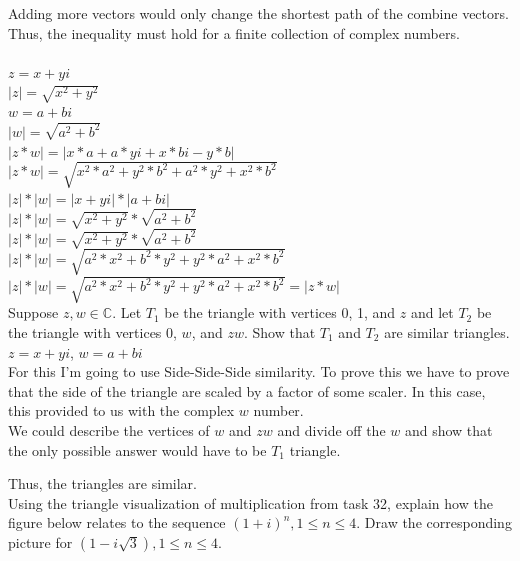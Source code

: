 \documentclass[12pt]{article}
\begin{document}
Adding more vectors would only change the shortest path of the combine vectors.\\

Thus, the inequality must hold for a finite collection of complex numbers.\\


\\
$z = x + yi$\\
$|z| = \sqrt{x^2 + y^2}$\\
$w = a + bi$\\
$|w| = \sqrt{a^2 + b^2}$\\

$|z * w| = |x*a + a*yi + x*bi - y*b|$\\
$|z * w| = \sqrt{x^2*a^2 + y^2*b^2 + a^2*y^2 + x^2*b^2}$\\

$|z| * |w| = |x + yi| * |a + bi|$\\
$|z| * |w| = \sqrt{x^2 + y^2} * \sqrt{a^2 + b^2}$\\
$|z| * |w| = \sqrt{x^2 + y^2} * \sqrt{a^2 + b^2}$\\
$|z| * |w| = \sqrt{a^2*x^2 + b^2*y^2 + y^2*a^2 + x^2*b^2}$\\
$|z| * |w| = \sqrt{a^2*x^2 + b^2*y^2 + y^2*a^2 + x^2*b^2} =  |z * w|$\\

 Suppose $z,w \in \mathbb{C}$. Let $T_1$ be the triangle with vertices 0, 1, and $z$ and let $T_2$ be the triangle with vertices 0, $w$, and $zw$. Show that $T_1$ and $T_2$ are similar triangles.\\
$z = x + yi$,
$w = a + bi$\\

For this I'm going to use Side-Side-Side similarity.
To prove this we have to prove that the side of the triangle are scaled by a factor of some scaler. 
In this case, this provided to us with the complex $w$ number.\\

We could describe the vertices of $w$ and $zw$ and divide off the $w$ and show that the only possible answer would have to be $T_1$ triangle. 

Thus, the triangles are similar.\\



 Using the triangle visualization of multiplication from task 32, explain how the figure below relates to the sequence $(1 + i)^n, 1 \leq n \leq 4$. 
Draw the corresponding picture for $(1 - i\sqrt{3}), 1 \leq n \leq 4$.\\
\end{document}
